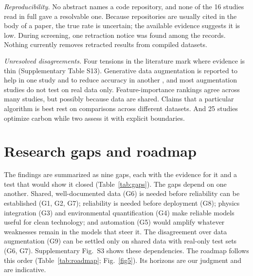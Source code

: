 \documentclass[pdflatex,sn-basic]{sn-jnl}
\begin{document}
\emph{Reproducibility.} No abstract names a code repository, and none of the 16 studies read in full gave a resolvable one. Because repositories are usually cited in the body of a paper, the true rate is uncertain; the available evidence suggests it is low. During screening, one retraction notice was found among the records. Nothing currently removes retracted results from compiled datasets.

\emph{Unresolved disagreements.} Four tensions in the literature mark where evidence is thin (Supplementary Table S13). Generative data augmentation is reported to help in one study \citep{gu2025} and to reduce accuracy in another \citep{liu2025}, and most augmentation studies do not test on real data only. Feature-importance rankings agree across many studies, but possibly because data are shared. Claims that a particular algorithm is best rest on comparisons across different datasets. And 25 studies optimize carbon while two assess it with explicit boundaries.

\section{Research gaps and roadmap}\label{sec:gaps}

The findings are summarized as nine gaps, each with the evidence for it and a test that would show it closed (Table~\ref{tab:gaps}). The gaps depend on one another. Shared, well-documented data (G6) is needed before reliability can be established (G1, G2, G7); reliability is needed before deployment (G8); physics integration (G3) and environmental quantification (G4) make reliable models useful for clean technology; and automation (G5) would amplify whatever weaknesses remain in the models that steer it. The disagreement over data augmentation (G9) can be settled only on shared data with real-only test sets (G6, G7). Supplementary Fig.~S3 shows these dependencies. The roadmap follows this order (Table~\ref{tab:roadmap}; Fig.~\ref{fig5}). Its horizons are our judgment and are indicative.
\end{document}

